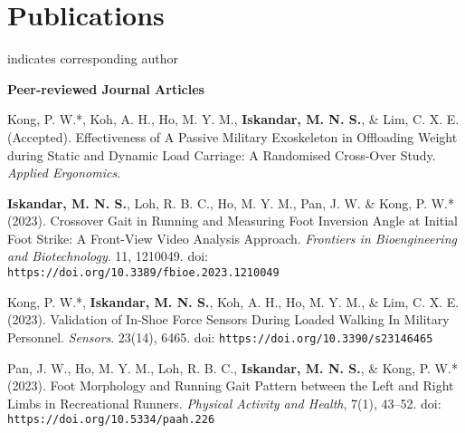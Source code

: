 \documentclass[../main.tex]{subfiles}
\begin{document}

\section{Publications} 
  \vspace{2pt}
  \resumeSubHeadingListStart
    \item
        \small \normalfont * indicates corresponding author
    \item
        \textbf{Peer-reviewed Journal Articles}  
        \def\labelprefix{J}
        \begin{etaremune}
            \item\label{article: spm exoskeleton}{Kong, P. W.*, Koh, A. H., Ho, M. Y. M., \textbf{Iskandar, M. N. S.}, \& Lim, C. X. E. (Accepted). Effectiveness of A Passive Military Exoskeleton in Offloading Weight during Static and Dynamic Load Carriage: A Randomised Cross-Over Study. \textit{Applied Ergonomics}. \href{https://github.com/Shahril-Iskandar/publication-exoskeleton}{\faGithub}}

            \item\label{article: frontiers crossover gait} {\textbf{Iskandar, M. N. S.}, Loh, R. B. C., Ho, M. Y. M., Pan, J. W. \& Kong, P. W.* (2023). Crossover Gait in Running and Measuring Foot Inversion Angle at Initial Foot Strike: A Front-View Video Analysis Approach. \textit{Frontiers in Bioengineering and Biotechnology}. 11, 1210049. doi: \nolinkurl{https://doi.org/10.3389/fbioe.2023.1210049} \href{https://doi.org/10.3389/fbioe.2023.1210049}{\faFilePdfO} \href{https://github.com/Shahril-Iskandar/publication-crossover-gait}{\faGithub}} %
            
            \item\label{article: sensors validation exoskeletal} {Kong, P. W.*, \textbf{Iskandar, M. N. S.}, Koh, A. H., Ho, M. Y. M., \& Lim, C. X. E. (2023). Validation of In-Shoe Force Sensors During Loaded Walking In Military Personnel. \textit{Sensors}. 23(14), 6465. doi: \nolinkurl{https://doi.org/10.3390/s23146465} \href{https://doi.org/10.3390/s23146465}{\faFilePdfO} \href{https://github.com/Shahril-Iskandar/publication-loadsol-validation-military}{\faGithub}} %
            
            \item\label{article: paah foot morphology} {Pan, J. W., Ho, M. Y. M., Loh, R. B. C., \textbf{Iskandar, M. N. S.}, \& Kong, P. W.* (2023). Foot Morphology and Running Gait Pattern between the Left and Right Limbs in Recreational Runners. \textit{Physical Activity and Health}, 7(1), 43–52. doi: \nolinkurl{https://doi.org/10.5334/paah.226} \href{https://doi.org/10.5334/paah.226}{\faFilePdfO}} %
        \end{etaremune}
                
\end{document}
